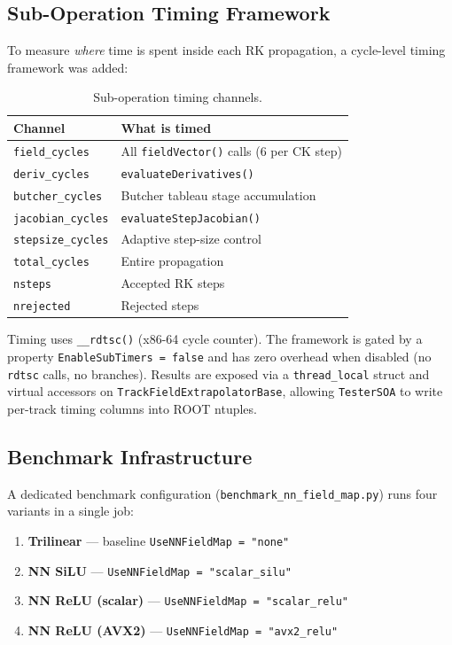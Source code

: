 \documentclass[11pt,a4paper]{article}
\begin{document}
\subsection{Sub-Operation Timing Framework}

To measure \emph{where} time is spent inside each RK propagation, a
cycle-level timing framework was added:

\begin{table}[H]
\centering
\caption{Sub-operation timing channels.}
\label{tab:subtimers}
\begin{tabular}{@{} l l @{}}
\toprule
Channel & What is timed \\
\midrule
\texttt{field\_cycles}    & All \texttt{fieldVector()} calls (6 per CK step) \\
\texttt{deriv\_cycles}    & \texttt{evaluateDerivatives()} \\
\texttt{butcher\_cycles}  & Butcher tableau stage accumulation \\
\texttt{jacobian\_cycles} & \texttt{evaluateStepJacobian()} \\
\texttt{stepsize\_cycles} & Adaptive step-size control \\
\texttt{total\_cycles}    & Entire propagation \\
\texttt{nsteps}           & Accepted RK steps \\
\texttt{nrejected}        & Rejected steps \\
\bottomrule
\end{tabular}
\end{table}

Timing uses \texttt{\_\_rdtsc()} (x86-64 cycle counter).  The framework
is gated by a property \texttt{EnableSubTimers = false} and has zero
overhead when disabled (no \texttt{rdtsc} calls, no branches).  Results
are exposed via a \texttt{thread\_local} struct and virtual accessors on
\texttt{TrackFieldExtrapolatorBase}, allowing \texttt{TesterSOA} to write
per-track timing columns into ROOT ntuples.

\subsection{Benchmark Infrastructure}

A dedicated benchmark configuration (\texttt{benchmark\_nn\_field\_map.py})
runs four variants in a single job:

\begin{enumerate}[nosep]
  \item \textbf{Trilinear} --- baseline \texttt{UseNNFieldMap = "none"}
  \item \textbf{NN SiLU} --- \texttt{UseNNFieldMap = "scalar\_silu"}
  \item \textbf{NN ReLU (scalar)} --- \texttt{UseNNFieldMap = "scalar\_relu"}
  \item \textbf{NN ReLU (AVX2)} --- \texttt{UseNNFieldMap = "avx2\_relu"}
\end{enumerate}
\end{document}
